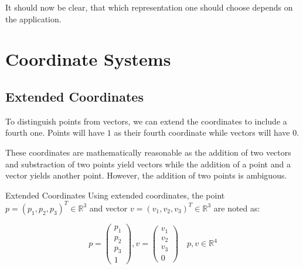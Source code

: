 \documentclass{panikzettel}
\begin{document}
It should now be clear, that which representation one should choose depends on the application.


\section{Coordinate Systems}

\subsection{Extended Coordinates}

\begin{halfboxl}
To distinguish points from vectors, we can extend the coordinates to include a fourth one. Points will have $1$ as their fourth coordinate while vectors will have $0$.

These coordinates are mathematically reasonable as the addition of two vectors and substraction of two points yield vectors while the addition of a point and a vector yields another point. However, the addition of two points is ambiguous.
\end{halfboxl}%
\begin{halfboxr}
\vspace{-\baselineskip}
\begin{defi}{Extended Coordinates}
Using extended coordinates, the point $p = (p_1, p_2, p_3)^T \in \mathbb{R}^3$ and vector \linebreak $v = (v_1, v_2, v_3)^T \in \mathbb{R}^3$ are noted as:

$$p = \begin{pmatrix} p_1 \\ p_2 \\ p_3 \\ 1 \end{pmatrix}, v = \begin{pmatrix} v_1 \\ v_2 \\ v_3 \\ 0 \end{pmatrix} \quad p, v \in \mathbb{R}^4$$
\end{defi}
\end{halfboxr}
\end{document}
